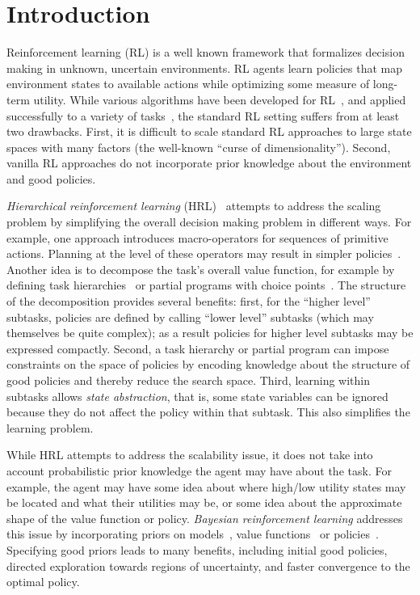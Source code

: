 \section{Introduction}
\label{sec:intro}

Reinforcement learning (RL) is a well known framework that formalizes
decision making in unknown, uncertain environments. RL agents learn
policies that map environment states to available actions while
optimizing some measure of long-term utility. While various algorithms
have been developed for RL~\cite{suttbarto}, and applied successfully
to a variety of tasks~\cite{kaelbling.jair96}, the standard RL setting
suffers from at least two drawbacks. First, it is difficult to scale
standard RL approaches to large state spaces with many factors (the
well-known ``curse of dimensionality''). Second, vanilla RL approaches
do not incorporate prior knowledge about the environment and good
policies.

{\em Hierarchical reinforcement learning} (HRL)~\cite{barto.deds03}
attempts to address the scaling problem by simplifying the overall
decision making problem in different ways. For example, one approach
introduces macro-operators for sequences of primitive actions. 
Planning at the level of these operators may result in
simpler policies~\cite{stolle.book02}. Another idea is to decompose
the task's overall value function, for example by
defining task hierarchies~\cite{d-hrl-00} or partial programs with
choice points~\cite{alisp}. The structure of the decomposition
provides several benefits: first, for the ``higher level'' subtasks,
policies are defined by calling ``lower level'' subtasks (which may
themselves be quite complex); as a result policies for higher level
subtasks may be expressed compactly. Second, a task hierarchy or
partial program can impose constraints on the space of policies by
encoding knowledge about the structure of good policies and thereby
reduce the search space. Third, learning within subtasks allows {\em
  state abstraction}, that is, some state variables can be ignored
because they do not affect the policy within that subtask. This also
simplifies the learning problem.

While HRL attempts to address the scalability issue, it does not take
into account probabilistic prior knowledge the agent may have about
the task. For example, the agent may have some idea about where
high/low utility states may be located and what their utilities may
be, or some idea about the approximate shape of the value function or
policy. {\em Bayesian reinforcement learning} addresses this issue by
incorporating priors on models~\cite{dearden.uai99}, value
functions~\cite{Dearden98, Engel03} or
policies~\cite{Ghavamzadeh07bayesianpolicy}.
Specifying good priors leads to many benefits, including initial good
policies, directed exploration towards regions of uncertainty, and
faster convergence to the optimal policy.

